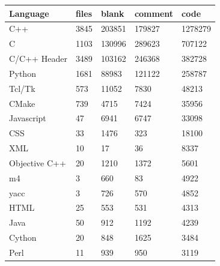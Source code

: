 \begin{appendix}
\begin{table}[htbp]
    \centering
    \caption{VTK, language statistic}
    \sffamily 
    \begin{longtable}{ l|l|l|l|l }
        \hline
        \textbf{Language}&      \textbf{files}&\textbf{blank}& \textbf{comment}& \textbf{code}\\
        \hline
        C++                                   &3845         &203851         &179827        &1278279\\
        C                                     &1103         &130996         &289623        &707122\\
        C/C++ Header                          &3489         &103162         &246368        & 382728\\
        Python                                &1681         & 88983         &121122        & 258787\\
        Tcl/Tk                                & 573         & 11052         &  7830        &  48213\\
        CMake                                 & 739         &  4715         &  7424        &  35956\\
        Javascript                            &  47         &  6941         &  6747        &  33098\\
        CSS                                   &  33         &  1476         &   323        &  18100\\
        XML                                   &  10         &    17         &    36        &   8337\\
        Objective C++                         &  20         &  1210         &  1372        &   5601\\
        m4                                    &   3         &   660         &    83        &   4922\\
        yacc                                  &   3         &   726         &   570        &   4852\\
        HTML                                  &  25         &   553         &   531        &   4313\\
        Java                                  &  50         &   912         &  1192        &   4239\\
        Cython                                &  20         &   848         &  1625        &   3484\\
        Perl                                  &  11         &   939         &   950        &   3119\\

\end{longtable}
\end{table}
\end{appendix}

